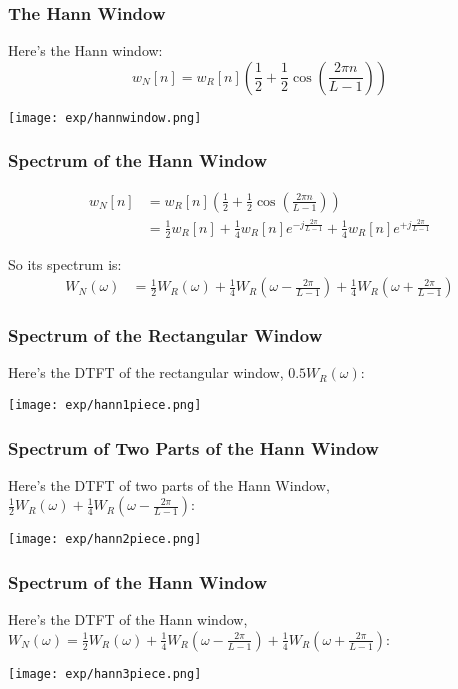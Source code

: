 \documentclass{beamer}
\begin{document}
\begin{frame}
  \frametitle{The Hann Window}

  Here's the Hann window:
  \begin{displaymath}
    w_N[n] = w_R[n]\left(\frac{1}{2} + \frac{1}{2}\cos\left(\frac{2\pi n}{L-1}\right)\right)
  \end{displaymath}
  \centerline{\texttt{[image: exp/hannwindow.png]}}
\end{frame}

\begin{frame}
  \frametitle{Spectrum of the Hann Window}

  \begin{align*}
    w_N[n] &= w_R[n]\left(\frac{1}{2} + \frac{1}{2}\cos\left(\frac{2\pi n}{L-1}\right)\right)\\
    &= \frac{1}{2} w_R[n] + \frac{1}{4}w_R[n]e^{-j\frac{2\pi}{L-1}}+ \frac{1}{4}w_R[n]e^{+j\frac{2\pi}{L-1}}
  \end{align*}

  So its spectrum is:
  \begin{align*}
    W_N(\omega) &= \frac{1}{2} W_R(\omega) + \frac{1}{4}W_R\left(\omega-\frac{2\pi}{L-1}\right)+
    \frac{1}{4}W_R\left(\omega+\frac{2\pi}{L-1}\right)
  \end{align*}
\end{frame}

\begin{frame}
  \frametitle{Spectrum of the Rectangular Window}

  Here's the DTFT of the rectangular window, $0.5W_R(\omega)$:

  \begin{center}
    \texttt{[image: exp/hann1piece.png]}
  \end{center}
\end{frame}

\begin{frame}
  \frametitle{Spectrum of Two Parts of the Hann Window}

  Here's the DTFT of two parts of the Hann Window,
  $\frac{1}{2}W_R(\omega)+\frac{1}{4}W_R\left(\omega-\frac{2\pi}{L-1}\right)$:

  \begin{center}
    \texttt{[image: exp/hann2piece.png]}
  \end{center}
\end{frame}


\begin{frame}
  \frametitle{Spectrum of the Hann Window}

  Here's the DTFT of the Hann window,
  $W_N(\omega)=\frac{1}{2}W_R(\omega)+\frac{1}{4}W_R\left(\omega-\frac{2\pi}{L-1}\right)+\frac{1}{4}W_R\left(\omega+\frac{2\pi}{L-1}\right)$:

  \begin{center}
    \texttt{[image: exp/hann3piece.png]}
  \end{center}
\end{frame}
\end{document}
